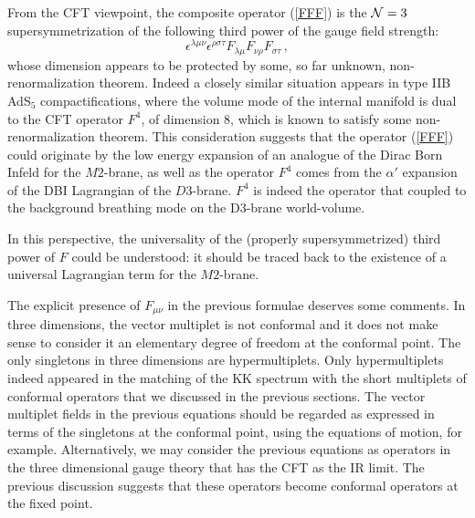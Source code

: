 \documentclass[a4paper,12pt]{article}
\begin{document}
From the CFT viewpoint, the composite operator (\ref{FFF}) is the
${\cal N}=3$ supersymmetrization of the following third power of
the gauge field strength:
$$
  \epsilon^{\lambda\mu\nu}\epsilon^{\rho\sigma\tau}
  F_{\lambda\mu}F_{\nu\rho}F_{\sigma\tau}\,,
$$
whose dimension appears to be protected by some, so far unknown,
non-renormalization theorem.
Indeed a closely similar situation appears in type IIB AdS$_5$
compactifications, where the volume mode of the internal manifold
is dual to the CFT operator $F^4$, of dimension 8, which is
known to satisfy some non-renormalization theorem.
This consideration suggests that the operator (\ref{FFF}) could
originate by the low energy expansion of an analogue of the Dirac Born
Infeld for the $M2$-brane, as well as the operator $F^4$ comes from the
$\alpha'$ expansion of the DBI Lagrangian of the $D3$-brane.
$F^4$ is indeed the operator that coupled to the background breathing
mode on the D3-brane world-volume.
\par
In this perspective, the universality of the (properly supersymmetrized)
third power of $F$ could be understood: it should be traced
back to the existence of a universal Lagrangian term for the $M2$-brane.
\par
The explicit presence of $F_{\mu\nu}$ in the previous formulae deserves
some comments.
In three dimensions, the vector multiplet is not conformal and it does
not make sense to consider it an elementary degree of freedom at the
conformal point. The only singletons in three dimensions are
hypermultiplets. Only hypermultiplets indeed appeared in the matching
of the KK spectrum with the short multiplets of conformal operators
that we discussed in the previous sections. The vector multiplet fields
in the previous equations should be regarded as expressed in terms
of the singletons at the conformal point, using the equations
of motion, for example. Alternatively, we may consider the previous
equations as operators in the three dimensional gauge theory that has
the CFT as the IR limit. The previous discussion suggests that these
operators become conformal operators at the fixed point.
%
%
\end{document}
